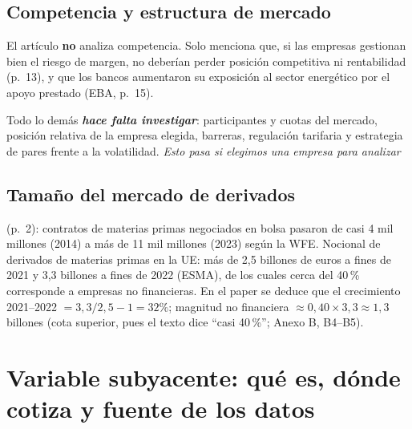 \documentclass{article} %
\newcommand{\pg}[1]{(p.~#1)}
\begin{document}
    \subsection{Competencia y estructura de mercado}

        El artículo \textbf{no} analiza competencia. 
        Solo menciona que, si las empresas gestionan bien el riesgo de margen, 
        no deberían perder posición competitiva ni rentabilidad \pg{13}, 
        y que los bancos aumentaron su exposición al sector energético por el apoyo prestado 
        (EBA, p.~15). 
        
        Todo lo demás \textit{\textbf{hace falta investigar}}: participantes y cuotas del mercado, 
        posición relativa de la empresa elegida, barreras, 
        regulación tarifaria y estrategia de pares frente a la volatilidad. 
        \textit{Esto pasa si elegimos una empresa para analizar}

    \subsection{Tamaño del mercado de derivados}

        \pg{2}: contratos de materias primas negociados en bolsa pasaron de casi 4 mil millones (2014) 
        a más de 11 mil millones (2023) según la WFE. Nocional de derivados de materias primas en la UE: 
        más de 2,5 billones de euros a fines de 2021 y 3,3 billones a fines de 2022 (ESMA), 
        de los cuales cerca del 40\,\% corresponde a empresas no financieras. 
        En el paper se deduce que el crecimiento 2021--2022 $=3{,}3/2{,}5-1=32\%$; 
        magnitud no financiera $\approx0{,}40\times3{,}3\approx1{,}3$ billones 
        (cota superior, pues el texto dice ``casi 40\,\%''; Anexo B, B4--B5).

\section{Variable subyacente: qué es, dónde cotiza y fuente de los datos}
\end{document}
